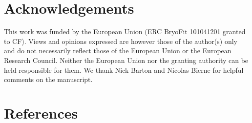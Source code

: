 \documentclass[
  11pt,
]{article}
\begin{document}
\hypertarget{acknowledgements}{%
\section{Acknowledgements}\label{acknowledgements}}

This work was funded by the European Union (ERC BryoFit 101041201
granted to CF). Views and opinions expressed are however those of the
author(s) only and do not necessarily reflect those of the European
Union or the European Research Council. Neither the European Union nor
the granting authority can be held responsible for them. We thank Nick
Barton and Nicolas Bierne for helpful comments on the manuscript.

\hypertarget{references}{%
\section{References}\label{references}}
\end{document}

